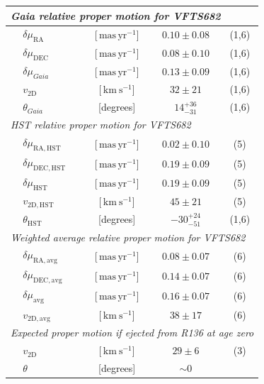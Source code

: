 \documentclass[a4paper,fleqn,usenatbib]{mnras}
\newcommand{\SdM}[1]{{{\color{brown}{#1}}}}
\newcommand{\kms}{{\,\mathrm{km\ s^{-1}}}}
\newcommand{\masyr}{\,\mathrm{mas}\,\mathrm{yr}^{-1}}
\begin{document}
\begin{table}
\begin{center}
\begin{tabular}{llc|c|c}
                


      \multicolumn{5}{l}{\emph{Gaia relative proper motion for VFTS682 }} \\
      \hline
      &$\delta\mu_\mathrm{RA}$  &[$\masyr$] & $0.10\pm0.08$ & (1,6) \\
      &$\delta\mu_\mathrm{DEC}$  &[$\masyr$] & $0.08\pm0.10$ &  (1,6) \\
      &$\delta\mu_{Gaia}$  &[$\masyr$] & $0.13\pm0.09$ &  (1,6) \\
      &$v_\mathrm{2D}$  &[$\kms$] & $32\pm21$ & (1,6)\\  
      &$\theta_{Gaia}$  &[degrees] &  $14_{-31}^{+36}$  & (1,6)\\  

 \hline     
      \multicolumn{5}{l}{\emph{HST relative proper motion for VFTS682}} \\
            \hline
      &$\delta\mu_\mathrm{RA, HST}$  &[$\masyr$] & $0.02\pm0.10$ & (5) \\
      &$\delta\mu_\mathrm{DEC, HST}$  &[$\masyr$] & $0.19\pm0.09$ &  (5) \\
       &$\delta\mu_\mathrm{HST}$  &[$\masyr$] & $0.19\pm0.09$ &  (5) \\
                  &$v_\mathrm{2D, HST}$  &[$\kms$] & $45\pm21$ & (5)\\  
                      &$\theta_\mathrm{HST}$  &[degrees] &   $-30_{-51}^{+24}$   & (1,6)\\  
      \hline
      \multicolumn{5}{l}{\emph{Weighted average relative proper motion
      for VFTS682}}\\
      \hline
      &$\delta\mu_\mathrm{RA, avg}$  &[$\masyr$] & $0.08\pm0.07$ & (6) \\
      &$\delta\mu_\mathrm{DEC, avg}$  &[$\masyr$] & $0.14\pm0.07$ &  (6) \\
       &$\delta\mu_\mathrm{avg}$  &[$\masyr$] & $0.16\pm0.07$ &  (6) \\
      &$v_\mathrm{2D, avg}$  &[$\kms$] & $38\pm17$ & (6)\\
      \hline
       \multicolumn{5}{l}{\emph{Expected proper motion if ejected from
      R136 at age zero}} \\
      \hline
      &$v_\mathrm{2D}$  &[$\kms$] & $29\pm 6$ & (3) \\  
      &$\theta$  &[degrees] &  $\sim0$  & \\ 
       \hline


\end{tabular}
\end{center}
\end{table}
\end{document}
